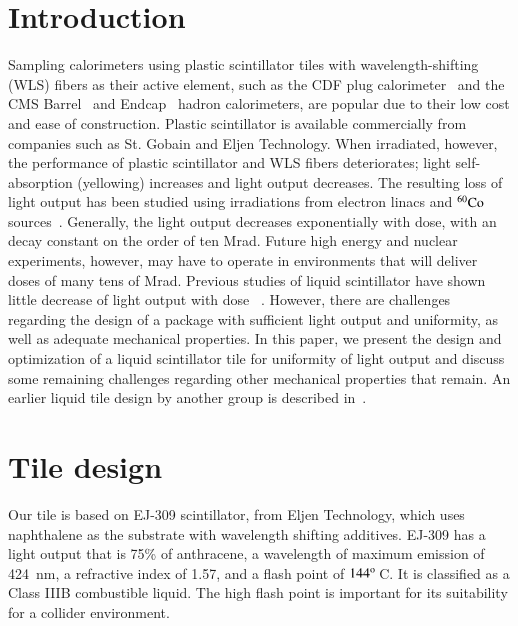\documentclass[review]{elsarticle}
\begin{document}
\linenumbers

\section{Introduction}
Sampling calorimeters using plastic scintillator tiles with
wavelength-shifting (WLS) fibers as their active element, such as the CDF plug
calorimeter~\cite{Aota1995557} and the CMS Barrel~\cite{CMSHB} and
Endcap~\cite{HCALTDR1997} hadron calorimeters, are popular due to their
low cost and ease of construction. Plastic scintillator is available
commercially from companies such as St. Gobain and Eljen Technology. When
irradiated, however, the performance of plastic scintillator and WLS
fibers deteriorates; light self-absorption (yellowing) increases and
light output decreases. The resulting loss of light output 
has been studied using irradiations
from electron linacs and ${\rm ^{60}Co}$ sources~\cite{vasken,ByonWagner1993263}.
Generally, the light output decreases exponentially with dose, with an
decay constant on the order of ten Mrad. Future high energy and nuclear
experiments, however, may have to operate in environments that will
deliver doses of many tens of Mrad.
Previous studies of liquid scintillator have shown little decrease
of light output with dose ~\cite{zornliquid,Klein1967399,berlman}.
However, there are challenges regarding the design of a package
with sufficient light output and uniformity, as well as 
adequate mechanical properties.
In this paper, we present the design
and optimization of a liquid scintillator tile for uniformity
of light output and discuss some remaining challenges regarding
other mechanical properties that remain.
An earlier liquid tile design by another group is described in~\cite{liquidrandy}.

\section{Tile design}
\label{sec:design}
Our tile is based on EJ-309 scintillator, from Eljen Technology, which
uses naphthalene as the substrate with wavelength shifting additives.
EJ-309 has a light output that is 75\% of anthracene, a wavelength of
maximum emission of 424~nm, a refractive index of 1.57, and a flash
point of $\rm{144^o}$\,C. It is classified as a Class IIIB combustible liquid.
The high flash point is important for its
suitability for a collider environment.
\end{document}
